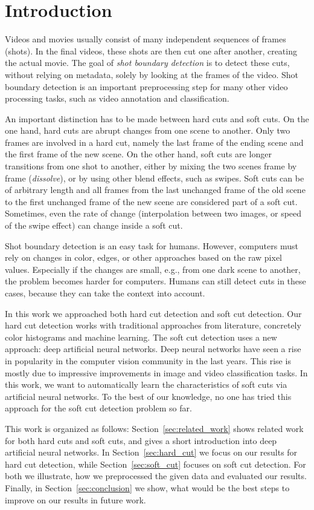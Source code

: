 \section{Introduction}
\label{sec:introduction}

Videos and movies usually consist of many independent sequences of frames (shots).
In the final videos, these shots are then cut one after another, creating the actual movie.
The goal of \emph{shot boundary detection} is to detect these cuts, without relying on metadata, solely by looking at the frames of the video.
Shot boundary detection is an important preprocessing step for many other video processing tasks, such as video annotation and classification.

An important distinction has to be made between hard cuts and soft cuts.
On the one hand, hard cuts are abrupt changes from one scene to another.
Only two frames are involved in a hard cut, namely the last frame of the ending scene and the first frame of the new scene.
On the other hand, soft cuts are longer transitions from one shot to another, either by mixing the two scenes frame by frame (\emph{dissolve}), or by using other blend effects, such as swipes.
Soft cuts can be of arbitrary length and all frames from the last unchanged frame of the old scene to the first unchanged frame of the new scene are considered part of a soft cut.
Sometimes, even the rate of change (interpolation between two images, or speed of the swipe effect) can change inside a soft cut.

Shot boundary detection is an easy task for humans.
However, computers must rely on changes in color, edges, or other approaches based on the raw pixel values.
Especially if the changes are small, e.g., from one dark scene to another, the problem becomes harder for computers.
Humans can still detect cuts in these cases, because they can take the context into account.

In this work we approached both hard cut detection and soft cut detection.
Our hard cut detection works with traditional approaches from literature, concretely color histograms and machine learning.
The soft cut detection uses a new approach: deep artificial neural networks.
Deep neural networks have seen a rise in popularity in the computer vision community in the last years.
This rise is mostly due to impressive improvements in image and video classification tasks.
In this work, we want to automatically learn the characteristics of soft cuts via artificial neural networks.
To the best of our knowledge, no one has tried this approach for the soft cut detection problem so far.

This work is organized as follows:
Section~\ref{sec:related_work} shows related work for both hard cuts and soft cuts, and gives a short introduction into deep artificial neural networks.
In Section~\ref{sec:hard_cut} we focus on our results for hard cut detection, while Section~\ref{sec:soft_cut} focuses on soft cut detection.
For both we illustrate, how we preprocessed the given data and evaluated our results.
Finally, in Section~\ref{sec:conclusion} we show, what would be the best steps to improve on our results in future work.
